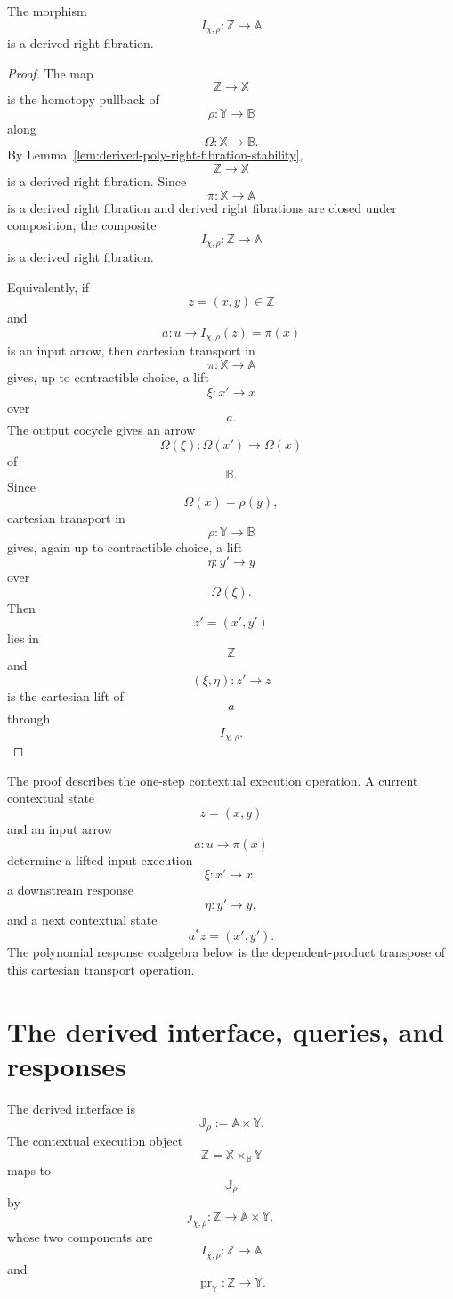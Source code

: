 \begin{proposition}
\label{prop:derived-poly-contextual-right-fibration}
The morphism
\[
I_{\chi,\rho}:\mathbb Z\to\mathbb A
\]
is a derived right fibration.
\end{proposition}

\begin{proof}
The map
\[
\mathbb Z\to\mathbb X
\]
is the homotopy pullback of
\[
\rho:\mathbb Y\to\mathbb B
\]
along
\[
\Omega:\mathbb X\to\mathbb B.
\]
By Lemma~\ref{lem:derived-poly-right-fibration-stability},
\[
\mathbb Z\to\mathbb X
\]
is a derived right fibration.  Since
\[
\pi:\mathbb X\to\mathbb A
\]
is a derived right fibration and derived right fibrations are closed under
composition, the composite
\[
I_{\chi,\rho}:\mathbb Z\to\mathbb A
\]
is a derived right fibration.

Equivalently, if
\[
z=(x,y)\in\mathbb Z
\]
and
\[
a:u\to I_{\chi,\rho}(z)=\pi(x)
\]
is an input arrow, then cartesian transport in
\[
\pi:\mathbb X\to\mathbb A
\]
gives, up to contractible choice, a lift
\[
\xi:x'\to x
\]
over
\[
a.
\]
The output cocycle gives an arrow
\[
\Omega(\xi):\Omega(x')\to\Omega(x)
\]
of
\[
\mathbb B.
\]
Since
\[
\Omega(x)=\rho(y),
\]
cartesian transport in
\[
\rho:\mathbb Y\to\mathbb B
\]
gives, again up to contractible choice, a lift
\[
\eta:y'\to y
\]
over
\[
\Omega(\xi).
\]
Then
\[
z'=(x',y')
\]
lies in
\[
\mathbb Z
\]
and
\[
(\xi,\eta):z'\to z
\]
is the cartesian lift of
\[
a
\]
through
\[
I_{\chi,\rho}.
\]
\end{proof}

\begin{remark}
\label{rem:derived-poly-contextual-transport}
The proof describes the one-step contextual execution operation.  A current
contextual state
\[
z=(x,y)
\]
and an input arrow
\[
a:u\to\pi(x)
\]
determine a lifted input execution
\[
\xi:x'\to x,
\]
a downstream response
\[
\eta:y'\to y,
\]
and a next contextual state
\[
a^\ast z=(x',y').
\]
The polynomial response coalgebra below is the dependent-product transpose of
this cartesian transport operation.
\end{remark}

\section{The derived interface, queries, and responses}
\label{sec:derived-poly-interface-queries-responses}

The derived interface is
\[
\mathbb J_\rho
:=
\mathbb A\times\mathbb Y.
\]
The contextual execution object
\[
\mathbb Z=\mathbb X\times_{\mathbb B}\mathbb Y
\]
maps to
\[
\mathbb J_\rho
\]
by
\[
j_{\chi,\rho}:\mathbb Z\to\mathbb A\times\mathbb Y,
\]
whose two components are
\[
I_{\chi,\rho}:\mathbb Z\to\mathbb A
\]
and
\[
\operatorname{pr}_{\mathbb Y}:\mathbb Z\to\mathbb Y.
\]

